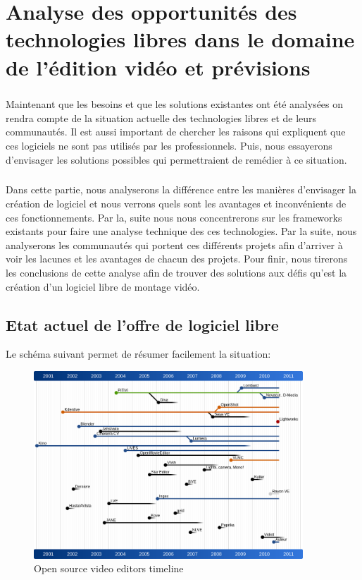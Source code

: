 \chapter{Analyse des opportunités des technologies libres dans
le domaine de l'édition vidéo et prévisions}
\minitoc \newpage

\paragraph{}
Maintenant que les besoins et que les solutions existantes
ont été analysées on rendra compte de la
situation actuelle des technologies libres et de leurs communautés. Il est
aussi important de chercher les raisons qui expliquent que ces
logiciels ne sont pas utilisés par les professionnels. Puis, nous essayerons
d'envisager les solutions possibles qui permettraient de remédier à ce
situation.

\paragraph{}
Dans cette partie, nous analyserons la différence entre les
manières d'envisager la création de logiciel et nous verrons quels sont les
avantages et inconvénients de ces fonctionnements. Par la, suite nous
nous concentrerons sur les frameworks existants pour faire une analyse
technique des ces technologies. Par la suite, nous analyserons
les communautés qui portent ces différents projets afin d'arriver à
voir les lacunes et les avantages de chacun des projets.  Pour finir,
nous tirerons les conclusions de cette analyse afin de trouver des
solutions aux défis qu'est la création d'un logiciel libre de montage
vidéo.

\newpage
\section {Etat actuel de l'offre de logiciel libre}

Le schéma suivant permet de résumer facilement la situation:

\begin{figure} [h]
  \begin{center}
    \includegraphics[width=0.9\textwidth]{images/open-source-video-editor-timeline}
  \end{center} \caption{Open source video editors timeline} \label{Yes}
\end{figure}

